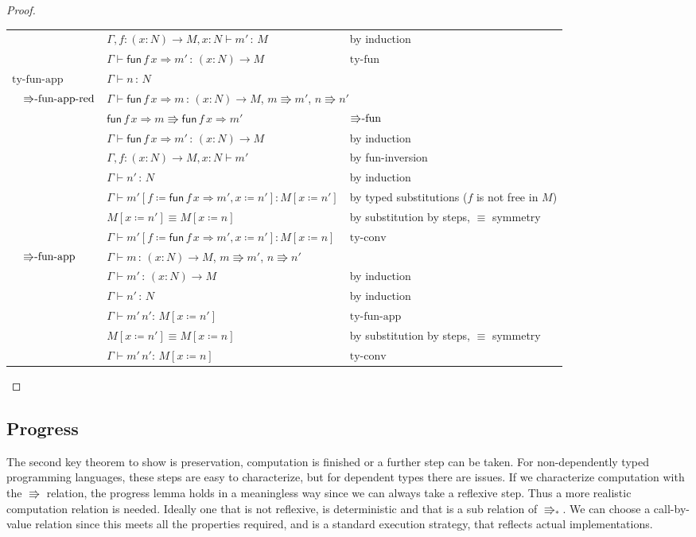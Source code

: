 \begin{proof}
\begin{tabular}{llll}
 &  & $\Gamma,f:\left(x:N\right)\rightarrow M,x:N\vdash m'\,:\,M$ & by induction \tabularnewline
 &  & $\Gamma\vdash\mathsf{fun}\,f\,x\Rightarrow m'\,:\,\left(x:N\right)\rightarrow M$ & $\textrm{ty-fun}$\tabularnewline
\multicolumn{2}{l}{$\textrm{ty-fun-app}$} & $\Gamma\vdash n\,:\,N$ & \tabularnewline
 & $\textrm{\ensuremath{\Rrightarrow}-fun-app-red}$ & \multicolumn{2}{l}{$\Gamma\vdash\mathsf{fun}\,f\,x\Rightarrow m\,:\,\left(x:N\right)\rightarrow M$,
$m\Rrightarrow m'$, $n\Rrightarrow n'$}\tabularnewline
 &  & $\mathsf{fun}\,f\,x\Rightarrow m\Rrightarrow\mathsf{fun}\,f\,x\Rightarrow m'$ & $\textrm{\ensuremath{\Rrightarrow}-fun}$\tabularnewline
 &  & $\Gamma\vdash\mathsf{fun}\,f\,x\Rightarrow m'\,:\,\left(x:N\right)\rightarrow M$ & by induction\tabularnewline
 &  & $\Gamma,f:\left(x:N\right)\rightarrow M,x:N\vdash m'$ & by fun-inversion\tabularnewline
 &  & $\Gamma\vdash n'\,:\,N$ & by induction\tabularnewline
 &  & $\Gamma\vdash m'\left[f\coloneqq\mathsf{fun}\,f\,x\Rightarrow m',x\coloneqq n'\right]:M\left[x\coloneqq n'\right]$ & by typed substitutions ($f$ is not free in $M$)\tabularnewline
 &  & $M\left[x\coloneqq n'\right]\equiv M\left[x\coloneqq n\right]$ & by substitution by steps, $\equiv$ symmetry\tabularnewline
 &  & $\Gamma\vdash m'\left[f\coloneqq\mathsf{fun}\,f\,x\Rightarrow m',x\coloneqq n'\right]:M\left[x\coloneqq n\right]$ & $\textrm{ty-conv}$\tabularnewline
 & $\textrm{\ensuremath{\Rrightarrow}-fun-app}$ & $\Gamma\vdash m\,:\,\left(x:N\right)\rightarrow M$, $m\Rrightarrow m'$,
$n\Rrightarrow n'$ & \tabularnewline
 &  & $\Gamma\vdash m'\,:\,\left(x:N\right)\rightarrow M$ & by induction\tabularnewline
 &  & $\Gamma\vdash n'\,:\,N$ & by induction\tabularnewline
 &  & $\Gamma\vdash m'\,n':\,M\left[x\coloneqq n'\right]$ & $\textrm{ty-fun-app}$\tabularnewline
 &  & $M\left[x\coloneqq n'\right]\equiv M\left[x\coloneqq n\right]$ & by substitution by steps, $\equiv$ symmetry\tabularnewline
 &  & $\Gamma\vdash m'\,n':\,M\left[x\coloneqq n\right]$ & $\textrm{ty-conv}$\tabularnewline
\end{tabular}
\end{proof}

\subsection{Progress}

The second key theorem to show is preservation, computation is finished or a further step can be taken.
For non-dependently typed programming languages, these steps are easy to characterize, but for dependent types there are issues.
If we characterize computation with the $\Rrightarrow$ relation, the progress lemma holds in a meaningless way since we can always take a reflexive step.
Thus a more realistic computation relation is needed.
Ideally one that is not reflexive, is deterministic and that is a sub relation of $\Rrightarrow_{*}$.
We can choose a call-by-value relation since this meets all the properties required, and is a standard execution strategy, that reflects actual implementations.

